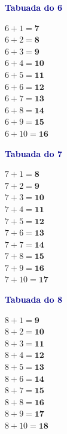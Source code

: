 \documentclass[12pt]{article}
\begin{document}
\vspace{10pt}\noindent
\begin{minipage}[t]{3.3cm}
\noindent\textcolor{darkblue}{\bfseries\small Tabuada do 6}\par\vspace{2pt}
{\footnotesize
$6{+}1=\mathbf{7}$\\$6{+}2=\mathbf{8}$\\$6{+}3=\mathbf{9}$\\
$6{+}4=\mathbf{10}$\\$6{+}5=\mathbf{11}$\\$6{+}6=\mathbf{12}$\\
$6{+}7=\mathbf{13}$\\$6{+}8=\mathbf{14}$\\$6{+}9=\mathbf{15}$\\
$6{+}10=\mathbf{16}$}
\end{minipage}\hfill
\begin{minipage}[t]{3.3cm}
\noindent\textcolor{darkblue}{\bfseries\small Tabuada do 7}\par\vspace{2pt}
{\footnotesize
$7{+}1=\mathbf{8}$\\$7{+}2=\mathbf{9}$\\$7{+}3=\mathbf{10}$\\
$7{+}4=\mathbf{11}$\\$7{+}5=\mathbf{12}$\\$7{+}6=\mathbf{13}$\\
$7{+}7=\mathbf{14}$\\$7{+}8=\mathbf{15}$\\$7{+}9=\mathbf{16}$\\
$7{+}10=\mathbf{17}$}
\end{minipage}\hfill
\begin{minipage}[t]{3.3cm}
\noindent\textcolor{darkblue}{\bfseries\small Tabuada do 8}\par\vspace{2pt}
{\footnotesize
$8{+}1=\mathbf{9}$\\$8{+}2=\mathbf{10}$\\$8{+}3=\mathbf{11}$\\
$8{+}4=\mathbf{12}$\\$8{+}5=\mathbf{13}$\\$8{+}6=\mathbf{14}$\\
$8{+}7=\mathbf{15}$\\$8{+}8=\mathbf{16}$\\$8{+}9=\mathbf{17}$\\
$8{+}10=\mathbf{18}$}
\end{minipage}\hfill
\end{document}
